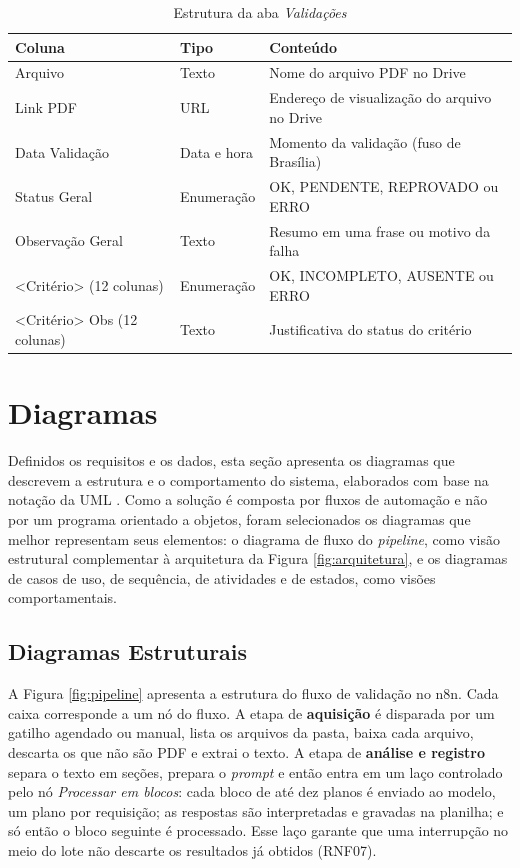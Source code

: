 \begin{table}[H]
\centering
\caption{Estrutura da aba \textit{Validações}}
\label{tab:colunas}
\footnotesize
\begin{tabular}{@{}L{4.6cm}L{2.0cm}L{7.8cm}@{}}
\toprule
{}
\textbf{Coluna} & \textbf{Tipo} & \textbf{Conteúdo} \\ \midrule
Arquivo & Texto & Nome do arquivo PDF no Drive \\
Link PDF & URL & Endereço de visualização do arquivo no Drive \\
Data Validação & Data e hora & Momento da validação (fuso de Brasília) \\
Status Geral & Enumeração & OK, PENDENTE, REPROVADO ou ERRO \\
Observação Geral & Texto & Resumo em uma frase ou motivo da falha \\
\textless Critério\textgreater{} (12 colunas) & Enumeração & OK, INCOMPLETO, AUSENTE ou ERRO \\
\textless Critério\textgreater{} Obs (12 colunas) & Texto & Justificativa do status do critério \\ \bottomrule
\end{tabular}
\end{table}

\section{Diagramas}
\label{sec:diagramas}

Definidos os requisitos e os dados, esta seção apresenta os diagramas que descrevem a estrutura e o comportamento do sistema, elaborados com base na notação da UML \cite{OMG2017}. Como a solução é composta por fluxos de automação e não por um programa orientado a objetos, foram selecionados os diagramas que melhor representam seus elementos: o diagrama de fluxo do \textit{pipeline}, como visão estrutural complementar à arquitetura da Figura \ref{fig:arquitetura}, e os diagramas de casos de uso, de sequência, de atividades e de estados, como visões comportamentais.

\subsection{Diagramas Estruturais}

A Figura \ref{fig:pipeline} apresenta a estrutura do fluxo de validação no n8n. Cada caixa corresponde a um nó do fluxo. A etapa de \textbf{aquisição} é disparada por um gatilho agendado ou manual, lista os arquivos da pasta, baixa cada arquivo, descarta os que não são PDF e extrai o texto. A etapa de \textbf{análise e registro} separa o texto em seções, prepara o \textit{prompt} e então entra em um laço controlado pelo nó \textit{Processar em blocos}: cada bloco de até dez planos é enviado ao modelo, um plano por requisição; as respostas são interpretadas e gravadas na planilha; e só então o bloco seguinte é processado. Esse laço garante que uma interrupção no meio do lote não descarte os resultados já obtidos (RNF07).

